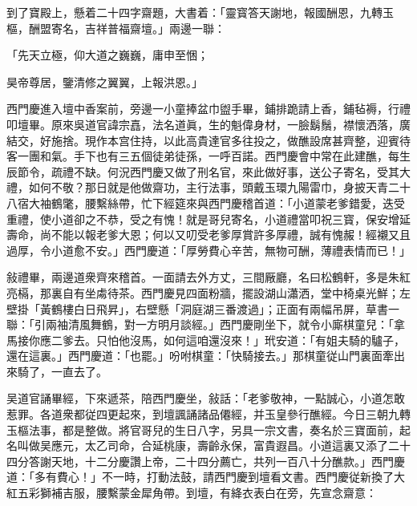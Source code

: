 到了寶殿上，懸着二十四字齋題，大書着：「靈寳答天謝地，報國酬恩，九轉玉樞，酬盟寄名，吉祥普福齋壇。」兩邊一聯：

\begin{myquote}
「先天立極，仰大道之巍巍，庸申至悃；

昊帝尊居，鑒清修之翼翼，上報洪恩。」
\end{myquote}

西門慶進入壇中香案前，旁邊一小童捧盆巾盥手畢，鋪排跪請上香，鋪毡褥，行禮叩壇畢。原來吳道官諱宗嚞，法名道眞，生的魁偉身材，一臉鬍鬚，襟懷洒落，廣結交，好施捨。現作本宫住持，以此高貴達官多往投之，做醮設席甚齊整，迎賓待客一團和氣。手下也有三五個徒弟徒孫，一呼百諾。西門慶會中常在此建醮，每生辰節令，疏禮不缺。何況西門慶又做了刑名官，來此做好事，送公子寄名，受其大禮，如何不敬？那日就是他做齋功，主行法事，頭戴玉環九陽雷巾，身披天青二十八宿大袖鶴氅，腰繫絲帶，忙下經筵來與西門慶稽首道：「小道蒙老爹錯愛，迭受重禮，使小道卻之不恭，受之有愧！就是哥兒寄名，小道禮當叩祝三寳，保安增延壽命，尚不能以報老爹大恩；何以又叨受老爹厚賞許多厚禮，誠有愧赧！經襯又且過厚，令小道愈不安。」西門慶道：「厚勞費心辛苦，無物可酬，薄禮表情而已！」

敍禮畢，兩邊道衆齊來稽首。一面請去外方丈，三間厰廳，名曰松鶴軒，多是朱紅亮槅，那裏自有坐䖏待茶。西門慶見四面粉牆，擺設湖山瀟洒，堂中椅桌光鮮；左壁掛「黃鶴樓白日飛昇」，右壁懸「洞庭湖三番渡過」；正面有兩幅吊屏，草書一聯：「引兩袖清風舞鶴，對一方明月談經。」西門慶剛坐下，就令小廝棋童兒：「拿馬接你應二爹去。只怕他沒馬，如何這咱還沒來！」玳安道：「有姐夫騎的驢子，還在這裏。」西門慶道：「也罷。」吩咐棋童：「快騎接去。」那棋童従山門裏面牽出來騎了，一直去了。

吴道官誦畢經，下來遞茶，陪西門慶坐，敍話：「老爹敬神，一點誠心，小道怎敢惹罪。各道衆都従四更起來，到壇諷誦諸品僊經，并玉皇參行醮經。今日三朝九轉玉樞法事，都是整做。將官哥兒的生日八字，另具一宗文書，奏名於三寶面前，起名叫做吴應元，太乙司命，合延桃康，壽齡永保，富貴遐昌。小道這裏又添了二十四分答謝天地，十二分慶讚上帝，二十四分薦亡，共列一百八十分醮款。」西門慶道：「多有費心！」不一時，打動法鼓，請西門慶到壇看文書。西門慶従新換了大紅五彩獅補吉服，腰繫蒙金犀角帶。到壇，有絳衣表白在旁，先宣念齋意：

